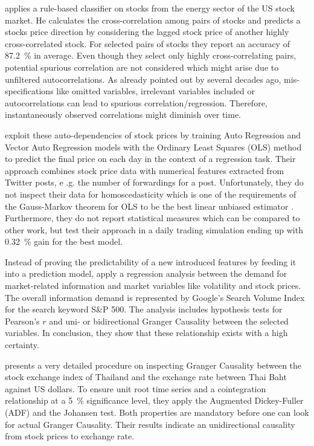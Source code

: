 \citet{Kim2016AModel} applies a rule-based classifier on stocks from the energy sector of the US stock market. He calculates the cross-correlation among pairs of stocks and predicts a stocks price direction by considering the lagged stock price of another highly cross-correlated stock. For selected pairs of stocks they report an accuracy of 87.2~\% in average. Even though they select only highly cross-correlating pairs, potential spurious correlation are not considered which might arise due to unfiltered autocorrelations. As already pointed out by \citet{Granger1974SpuriousEconometrics} several decades ago, mis-specifications like omitted variables, irrelevant variables included or autocorrelations can lead to spurious correlation/regression. Therefore, instantaneously observed correlations might diminish over time.

\citet{Ruiz2012CorrelatingActivity} exploit these auto-dependencies of stock prices by training Auto Regression and Vector Auto Regression models with the Ordinary Least Squares (OLS) method to predict the final price on each day in the context of a regression task. Their approach combines stock price data with numerical features extracted from Twitter posts, e .g. the number of forwardings for a post.  Unfortunately, they do not inspect their data for homoscedasticity which is one of the requirements of the Gauss-Markov theorem for OLS to be the best linear unbiased estimator \cite{Hallin2014Gauss-MarkovStatistics}. Furthermore, they do not report statistical measures which can be compared to other work, but test their approach in a daily trading simulation ending up with 0.32~\% gain for the best model.

Instead of proving the predictability of a new introduced features by feeding it into a prediction model, \citet{Vlastakis2012InformationVolatility} apply a regression analysis between the demand for market-related information and market variables like volatility and stock prices. The overall information demand is represented by Google's Search Volume Index for the search keyword S\&P 500. The analysis includes hypothesis tests for Pearson's $r$ and uni- or bidirectional Granger Causality between the selected variables. In conclusion, they show that these relationship exists with a high certainty.

\citet{Kosapattarapim2017GrangerThailand} presents a very detailed procedure on inspecting Granger Causality between the stock exchange index of Thailand and the exchange rate between Thai Baht against US dollars. To ensure unit root time series and a cointegration relationship at a 5~\% significance level, they apply the Augmented Dickey-Fuller (ADF) \cite{Dickey1976IntroductionSeries} and the Johansen test. Both properties are mandatory before one can look for actual Granger Causality. Their results indicate an unidirectional causality from stock prices to exchange rate.

